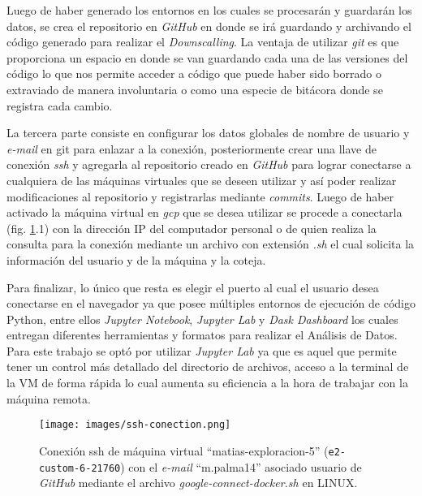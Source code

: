 Luego de haber generado los entornos en los cuales se procesarán y guardarán los datos, se crea el repositorio en \textit{GitHub} en 
donde se irá guardando y archivando el código generado para realizar el \textit{Downscalling}. La ventaja de utilizar \textit{git} es que proporciona un espacio en donde se van guardando cada una de las versiones del código 
lo que nos permite acceder a código que puede haber sido borrado o extraviado de manera involuntaria o como una especie de bitácora donde se registra cada cambio.

La tercera parte consiste en configurar los datos globales de nombre de usuario y \textit{e-mail} en git para
enlazar a la conexión, posteriormente crear una llave de conexión \textit{ssh} y agregarla al repositorio creado en \textit{GitHub} para lograr conectarse a cualquiera de las máquinas virtuales que se deseen utilizar y así poder realizar modificaciones 
al repositorio y registrarlas mediante \textit{commits}.
Luego de haber activado la máquina virtual en \textit{gcp} que se desea utilizar se procede a conectarla (fig. \ref{sshconec}.1) con la dirección IP del computador personal o de quien realiza la consulta para la conexión
mediante un archivo con extensión \textit{.sh} el cual solicita la información del usuario y de la máquina y la coteja.

Para finalizar, lo único que resta es elegir el puerto al cual el usuario desea conectarse en el navegador ya que posee múltiples entornos de ejecución de código Python, entre ellos \textit{Jupyter Notebook}, \textit{Jupyter Lab} y \textit{Dask Dashboard}
los cuales entregan diferentes herramientas y formatos para realizar el Análisis de Datos. Para este trabajo se optó por utilizar \textit{Jupyter Lab} ya que es aquel que permite tener un control más detallado del directorio de archivos, acceso a la terminal
de la VM de forma rápida lo cual aumenta su eficiencia a la hora de trabajar con la máquina remota. 

\begin{figure}[H]\label{sshconec}
    \centering
          \texttt{[image: images/ssh-conection.png]}
    \caption[Conexión ssh de máquina virtual]{\footnotesize Conexión ssh de máquina virtual ``matias-exploracion-5'' (\texttt{e2-custom-6-21760}) con el \textit{e-mail} ``m.palma14'' asociado usuario de \textit{GitHub} mediante el archivo \textit{google-connect-docker.sh} en LINUX.}
\end{figure}


%
%
%
%
